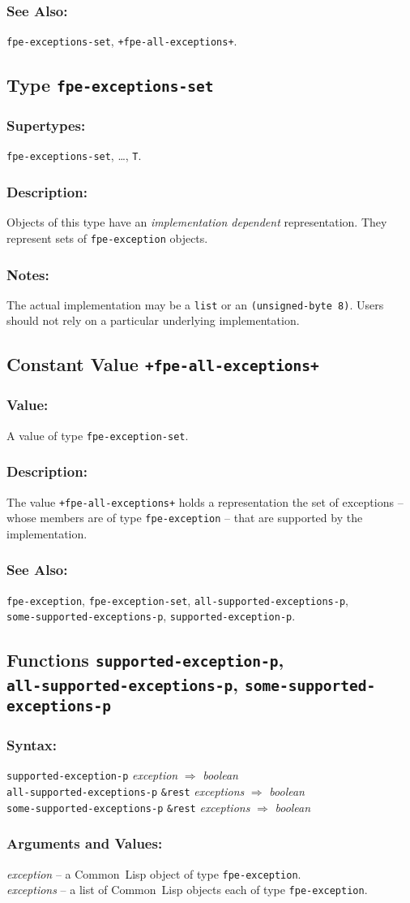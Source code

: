 \documentclass[10pt,fleqn]{article}
\newcommand{\CL}{\textsf{Common~Lisp}}
\newcommand{\code}[1]{\texttt{#1}}
\newcommand{\varname}[1]{\textit{#1}}
\newcommand{\DDictionaryItem}[1]{\vspace*{6pt}\noindent\hrulefill\vspace*{-9pt}\subsection*{#1}}
\newcommand{\DSyntax}{\subsubsection*{Syntax:}}
\newcommand{\DSupertypes}{\subsubsection*{Supertypes:}}
\newcommand{\DArgsNValues}{\subsubsection*{Arguments and Values:}}
\newcommand{\DDescription}{\subsubsection*{Description:}}
\newcommand{\DNotes}{\subsubsection*{Notes:}}
\newcommand{\DSeeAlso}{\subsubsection*{See Also:}}
\begin{document}
\DSeeAlso{}

\code{fpe-exceptions-set}, \code{+fpe-all-exceptions+}.


\DDictionaryItem{Type \code{fpe-exceptions-set}}

\DSupertypes{}

\code{fpe-exceptions-set}, \ldots, \code{T}.

\DDescription{}

Objects of this type have an \emph{implementation dependent}
representation. They represent sets of \code{fpe-exception} objects.

\DNotes{}

The actual implementation may be a \code{list} or an
\code{(unsigned-byte 8)}.  Users should not rely on a particular
underlying implementation.




\DDictionaryItem{Constant Value \code{+fpe-all-exceptions+}}

\subsubsection*{Value:}

A value of type \code{fpe-exception-set}.

\DDescription{}

The value \code{+fpe-all-exceptions+} holds a representation the set of
exceptions -- whose members are of type \code{fpe-exception} -- that
are supported by the implementation.


\DSeeAlso{}

\code{fpe-exception}, \code{fpe-exception-set},
\code{all-supported-exceptions-p},\\
\code{some-supported-exceptions-p},
\code{supported-exception-p}.


\DDictionaryItem{Functions \code{supported-exception-p},\\
  \code{all-supported-exceptions-p},
  \code{some-supported-exceptions-p}}

\DSyntax{}

\code{supported-exception-p}
\varname{exception} $\Rightarrow$ \textit{boolean}\\
\code{all-supported-exceptions-p} \code{\&rest}
\varname{exceptions} $\Rightarrow$ \textit{boolean}\\
\code{some-supported-exceptions-p} \code{\&rest}
\varname{exceptions} $\Rightarrow$ \textit{boolean}

\DArgsNValues{}

\varname{exception} -- a \CL{} object of type 
\code{fpe-exception}.\\
\varname{exceptions} -- a list of \CL{} objects each of type 
\code{fpe-exception}.
\end{document}
